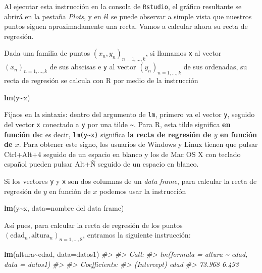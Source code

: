 \documentclass[
]{book}
\newenvironment{Shaded}{\begin{snugshade}}{\end{snugshade}}
\newcommand{\CommentTok}[1]{\textcolor[rgb]{0.56,0.35,0.01}{\textit{#1}}}
\newcommand{\DataTypeTok}[1]{\textcolor[rgb]{0.13,0.29,0.53}{#1}}
\newcommand{\KeywordTok}[1]{\textcolor[rgb]{0.13,0.29,0.53}{\textbf{#1}}}
\newcommand{\NormalTok}[1]{#1}
\newcommand{\OperatorTok}[1]{\textcolor[rgb]{0.81,0.36,0.00}{\textbf{#1}}}
\theoremstyle{definition}
\theoremstyle{definition}
\theoremstyle{definition}
\theoremstyle{remark}
\begin{document}
Al ejecutar esta instrucción en la consola de \texttt{Rstudio}, el gráfico resultante se abrirá en la pestaña \emph{Plots}, y en él se puede observar a simple vista que nuestros puntos siguen aproximadamente una recta.
Vamos a calcular ahora su recta de regresión.

Dada una familia de puntos \((x_n,y_n)_{n=1,\ldots,k}\), si llamamos \texttt{x} al vector \((x_n)_{n=1,\ldots,k}\) de sus abscisas e \texttt{y} al vector \((y_n)_{n=1,\ldots,k}\) de sus ordenadas, su recta de regresión se calcula con R por medio de la instrucción

\begin{Shaded}
\begin{Highlighting}[]
\KeywordTok{lm}\NormalTok{(y}\OperatorTok{\textasciitilde{}}\NormalTok{x)}
\end{Highlighting}
\end{Shaded}

Fijaos en la sintaxis: dentro del argumento de \texttt{lm}, primero va el vector \texttt{y}, seguido del vector \texttt{x} conectado a \texttt{y} por una tilde \texttt{\textasciitilde{}}. Para R, esta tilde significa \textbf{en función de}: es decir, \texttt{lm(y\textasciitilde{}x)} significa \textbf{la recta de regresión de \(y\) en función de \(x\)}. Para obtener este signo, los usuarios de Windows y Linux tienen que pulsar Ctrl+Alt+4 seguido de un espacio en blanco y los de Mac OS X con teclado español pueden pulsar Alt+Ñ seguido de un espacio en blanco.

Si los vectores \texttt{y} y \texttt{x} son dos columnas de un \emph{data frame}, para calcular la recta de regresión de \(y\) en función de \(x\) podemos usar la instrucción

\begin{Shaded}
\begin{Highlighting}[]
\KeywordTok{lm}\NormalTok{(y}\OperatorTok{\textasciitilde{}}\NormalTok{x, }\DataTypeTok{data=}\NormalTok{nombre del data frame)}
\end{Highlighting}
\end{Shaded}

Así pues, para calcular la recta de regresión de los puntos \((\mathrm{edad}_n,\textrm{altura}_n)_{n=1,\ldots,8}\), entramos la siguiente instrucción:

\begin{Shaded}
\begin{Highlighting}[]
\KeywordTok{lm}\NormalTok{(altura}\OperatorTok{\textasciitilde{}}\NormalTok{edad, }\DataTypeTok{data=}\NormalTok{datos1)}
\CommentTok{\#\textgreater{} }
\CommentTok{\#\textgreater{} Call:}
\CommentTok{\#\textgreater{} lm(formula = altura \textasciitilde{} edad, data = datos1)}
\CommentTok{\#\textgreater{} }
\CommentTok{\#\textgreater{} Coefficients:}
\CommentTok{\#\textgreater{} (Intercept)         edad  }
\CommentTok{\#\textgreater{}      73.968        6.493}
\end{Highlighting}
\end{Shaded}
\end{document}
